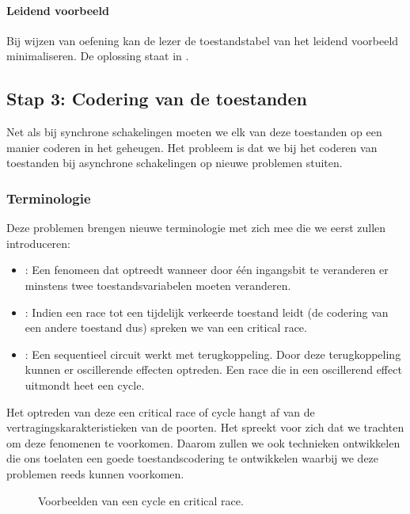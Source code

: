 \paragraph{Leidend voorbeeld} Bij wijzen van oefening kan de lezer de toestandstabel van het leidend voorbeeld minimaliseren. De oplossing staat in .
\subsection{Stap 3: Codering van de toestanden}
Net als bij synchrone schakelingen moeten we elk van deze toestanden op een manier coderen in het geheugen. Het probleem is dat we bij het coderen van toestanden bij asynchrone schakelingen op nieuwe problemen stuiten.
\subsubsection{Terminologie}
\label{term:race}
Deze problemen brengen nieuwe terminologie met zich mee die we eerst zullen introduceren:
\begin{itemize}
 \item {}: Een fenomeen dat optreedt wanneer door \'e\'en ingangsbit te veranderen er minstens twee toestandsvariabelen moeten veranderen.
 \item {}: Indien een race tot een tijdelijk verkeerde toestand leidt (de codering van een andere toestand dus) spreken we van een critical race.
 \item {}: Een sequentieel circuit werkt met terugkoppeling. Door deze terugkoppeling kunnen er oscillerende effecten optreden. Een race die in een oscillerend effect uitmondt heet een cycle.
\end{itemize}
Het optreden van deze een critical race of cycle hangt af van de vertragingskarakteristieken van de poorten. Het spreekt voor zich dat we trachten om deze fenomenen te voorkomen. Daarom zullen we ook technieken ontwikkelen die ons toelaten een goede toestandscodering te ontwikkelen waarbij we deze problemen reeds kunnen voorkomen.
\begin{figure}[hbt]
\centering
{}
\caption{Voorbeelden van een cycle en critical race.}
\end{figure}

